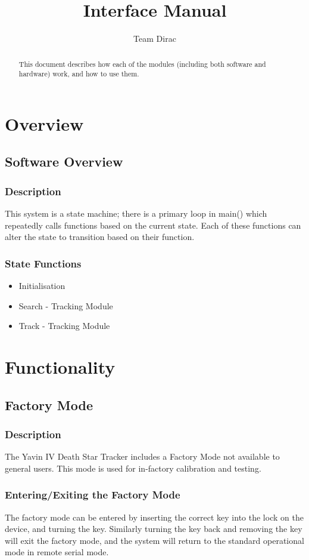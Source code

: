\documentclass[]{report}
\title{Interface Manual}
\author{Team Dirac}
\begin{document}
\maketitle

\begin{abstract}
	This document describes how each of the modules (including both software and hardware) work, and how to use them.
\end{abstract}

\part{Overview}
\chapter{Software Overview}
\section{Description}
This system is a state machine; there is a primary loop in main() which repeatedly calls functions based on the current state. Each of these functions can alter the state to transition based on their function.

\section{State Functions}
\begin{itemize}
	\item Initialisation
	\item Search - Tracking Module
	\item Track - Tracking Module
\end{itemize}

\part{Functionality}
\chapter{Factory Mode}
\section{Description}
The Yavin IV Death Star Tracker includes a Factory Mode not available to general users. This mode is used for in-factory calibration and testing.

\section{Entering/Exiting the Factory Mode}
The factory mode can be entered by inserting the correct key into the lock on the device, and turning the key. Similarly turning the key back and removing the key will exit the factory mode, and the system will return to the standard operational mode in remote serial mode.
\end{document}
